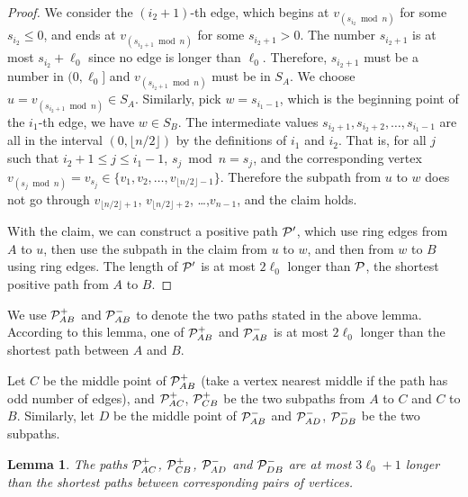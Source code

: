 \documentclass[11pt]{article}
\newtheorem{lem}{Lemma}
\begin{document}
\begin{proof}
We consider the $(i_2+1)$-th edge, which begins at $v_{(s_{i_2}\bmod n)}$ for some $s_{i_2}\leq 0$, and ends at $v_{(s_{i_2+1}\bmod n)}$ for some $s_{i_2+1}>0$. The number $s_{i_2+1}$ is at most $s_{i_2}+\ell_0$ since no edge is longer than $\ell_0$. Therefore, $s_{i_2+1}$ must be a number in $(0,\ell_0]$ and $v_{(s_{i_2+1}\bmod n)}$ must be in $S_A$. We choose $u=v_{(s_{i_2+1}\bmod n)}\in S_A$. Similarly, pick $w=s_{i_1-1}$, which is the beginning point of the $i_1$-th edge, we have $w\in S_B$. The intermediate values $s_{i_2+1},s_{i_2+2},\ldots,s_{i_1-1}$ are all in the interval $(0,\lfloor n/2\rfloor)$ by the definitions of $i_1$ and $i_2$. 
That is, for all $j$ such that $i_2 + 1 \le j \le i_1-1$, 
	$s_j \bmod n = s_j$, and the corresponding vertex $v_{(s_j\bmod n)} = v_{s_j}
	\in \{v_1, v_2, \ldots, v_{\lfloor n/2\rfloor-1}\}$.
Therefore the subpath from $u$ to $w$ does not go through $v_{\lfloor n/2\rfloor+1}$, $v_{\lfloor n/2\rfloor+2}$, \ldots,$v_{n-1}$, and the claim holds.

With the claim, we can construct a positive path $\cal P'$, which
	use ring edges from $A$ to $u$, then use the subpath in the claim
	from $u$ to $w$, and then from $w$ to $B$ using ring edges. 
The length of $\cal P'$ is at most $2\ell_0$ longer than $\cal P$, 
	the shortest positive path from $A$ to $B$.
\end{proof}

We use ${\cal P}_{AB}^+$ and ${\cal P}_{AB}^-$ to denote the two paths 
	stated in the above lemma. According to this lemma, one of ${\cal P}_{AB}^+$ and ${\cal P}_{AB}^-$ is at most $2\ell_0$ longer than the shortest path between $A$ and $B$.

Let $C$ be the middle point of ${\cal P}_{AB}^+$ (take a vertex nearest middle if the path has odd number of edges), and ${\cal P}_{AC}^+$, ${\cal P}_{CB}^+$ be the two subpaths from $A$ to $C$ and $C$ to $B$. Similarly, let $D$ be the middle point of ${\cal P}_{AB}^-$ and ${\cal P}_{AD}^-$, ${\cal P}_{DB}^-$ be the two subpaths.

\begin{lem} \label{lemma:ACshort}
The paths ${\cal P}_{AC}^+$, ${\cal P}_{CB}^+$, ${\cal P}_{AD}^-$ and ${\cal P}_{DB}^-$ are at most $3\ell_0+1$ longer than the shortest paths between corresponding pairs of vertices.
\end{lem}
\end{document}
